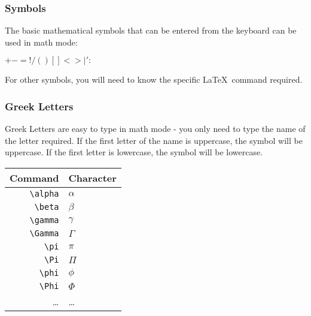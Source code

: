 \documentclass[mathserif]{beamer}
\begin{document}
\begin{frame}[fragile]
\frametitle{Symbols}
\vfill
The basic mathematical symbols that can be entered from the keyboard can be used in math mode:
\vfill
	\begin{LTXexample}[style=latexsty]
		$ + - = ! / ( ) [ ] < > | ' : $
	\end{LTXexample}
\vfill
For other symbols, you will need to know the specific \LaTeX\ command required.
\end{frame}

\begin{frame}[fragile]
\frametitle{Greek Letters}
\vfill
Greek Letters are easy to type in math mode - you only need to type the name of the letter required. If the first letter of the name is uppercase, the symbol will be uppercase. If the first letter is lowercase, the symbol will be lowercase.
\vfill
\begin{center}
\begin{tabular}{r | l}
	Command & Character \\
	\hline
	\texttt{{\textbackslash}alpha} & $\alpha$ \\
	\texttt{{\textbackslash}beta} & $\beta$ \\
	\texttt{{\textbackslash}gamma} & $\gamma$ \\
	\texttt{{\textbackslash}Gamma} & $\Gamma$ \\
	\texttt{{\textbackslash}pi} & $\pi$ \\
	\texttt{{\textbackslash}Pi} & $\Pi$ \\
	\texttt{{\textbackslash}phi} & $\phi$ \\
	\texttt{{\textbackslash}Phi} & $\Phi$ \\
	\ldots & \ldots \\				
\end{tabular}
\end{center}
\vfill
\end{frame}
\end{document}
